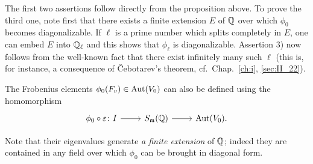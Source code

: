 The first two assertions follow directly from the proposition above. To prove 
the third one, note first that there exists a finite extension $E$ of $\mathbb{Q}$ over 
which $\phi_0$ becomes diagonalizable. If $\ell$ is a prime number which 
splits completely in $E$, one can embed $E$ into $\mathbb{Q}_\ell$ and this shows that 
$\phi_\ell$ is diagonalizable. Assertion 3) now follows from the well-known 
fact that there exist infinitely many such $\ell$ (this is, for instance, a 
consequence of \v Cebotarev's theorem, cf.\ Chap.~\ref{ch:i}, \ref{sec:II_22}).

\begin{obs}
The Frobenius elements $\phi_0(F_v) \in \operatorname{Aut}(V_0)$ can also be defined 
using the homomorphism
\[\begin{tikzcd}
	\phi_0 \circ \varepsilon \colon I \rar & S_\mathfrak{m}(\Q) \rar &
	\Aut(V_0).
\end{tikzcd}\]

Note that their eigenvalues generate \emph{a finite extension} of $\mathbb{Q}$; indeed 
they are contained in any field over which $\phi_0$ can be brought in 
diagonal form.
\end{obs}

